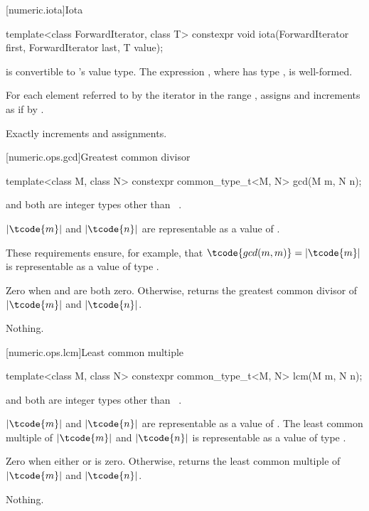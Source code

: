 [numeric.iota]{Iota}

%
\begin{itemdecl}
template<class ForwardIterator, class T>
  constexpr void iota(ForwardIterator first, ForwardIterator last, T value);
\end{itemdecl}

\begin{itemdescr}
\pnum
\mandates
{} is convertible to 's value type.
The expression , where  has type ,
is well-formed.

\pnum
\effects
For each element referred to by the iterator 
in the range ,
assigns  and increments 
as if by .

\pnum
\complexity
Exactly  increments and assignments.
\end{itemdescr}

[numeric.ops.gcd]{Greatest common divisor}

%
\begin{itemdecl}
template<class M, class N>
  constexpr common_type_t<M, N> gcd(M m, N n);
\end{itemdecl}

\begin{itemdescr}
\pnum
\mandates
{} and  both are integer types other than
\cv{}~.

\pnum
\expects
$|\tcode{m}|$ and $|\tcode{n}|$
are representable as a value of .
\begin{note}
These requirements ensure, for example,
that $\tcode{gcd(m, m)} = |\tcode{m}|$
is representable as a value of type .
\end{note}


\pnum
\returns
Zero when  and  are both zero. Otherwise,
returns the greatest common divisor of $|\tcode{m}|$ and $|\tcode{n}|$.

\pnum
\throws
Nothing.
\end{itemdescr}

[numeric.ops.lcm]{Least common multiple}

%
\begin{itemdecl}
template<class M, class N>
  constexpr common_type_t<M, N> lcm(M m, N n);
\end{itemdecl}

\begin{itemdescr}
\pnum
\mandates
{} and  both are integer types other than
\cv{}~.

\pnum
\expects
$|\tcode{m}|$ and $|\tcode{n}|$
are representable as a value of .
The least common multiple of $|\tcode{m}|$ and $|\tcode{n}|$
is representable as a value of type .

\pnum
\returns
Zero when either  or  is zero.
Otherwise, returns the least common multiple of $|\tcode{m}|$ and $|\tcode{n}|$.

\pnum
\throws
Nothing.
\end{itemdescr}


